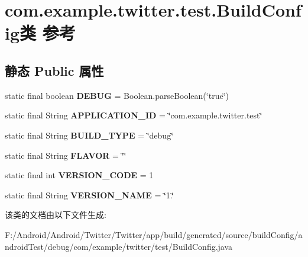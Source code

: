 \hypertarget{classcom_1_1example_1_1twitter_1_1test_1_1_build_config}{}\section{com.\+example.\+twitter.\+test.\+Build\+Config类 参考}
\label{classcom_1_1example_1_1twitter_1_1test_1_1_build_config}
\subsection*{静态 Public 属性}
\begin{DoxyCompactItemize}
\item 
\mbox{\label{classcom_1_1example_1_1twitter_1_1test_1_1_build_config_ab94e8127b73254c70626cb589c6c1d65}} 
static final boolean {\bfseries D\+E\+B\+UG} = Boolean.\+parse\+Boolean(\char`\"{}true\char`\"{})
\item 
\mbox{\label{classcom_1_1example_1_1twitter_1_1test_1_1_build_config_aeb41873f73cf3b7f644c9b7e0c5a8932}} 
static final String {\bfseries A\+P\+P\+L\+I\+C\+A\+T\+I\+O\+N\+\_\+\+ID} = \char`\"{}com.\+example.\+twitter.\+test\char`\"{}
\item 
\mbox{\label{classcom_1_1example_1_1twitter_1_1test_1_1_build_config_ac3eedf27570d97a56df8abfcb6372560}} 
static final String {\bfseries B\+U\+I\+L\+D\+\_\+\+T\+Y\+PE} = \char`\"{}debug\char`\"{}
\item 
\mbox{\label{classcom_1_1example_1_1twitter_1_1test_1_1_build_config_ae2790bc36f46a296ea5ec738c947e286}} 
static final String {\bfseries F\+L\+A\+V\+OR} = \char`\"{}\char`\"{}
\item 
\mbox{\label{classcom_1_1example_1_1twitter_1_1test_1_1_build_config_a4411d204c8696c3ef56d2db6340236f6}} 
static final int {\bfseries V\+E\+R\+S\+I\+O\+N\+\_\+\+C\+O\+DE} = 1
\item 
\mbox{\label{classcom_1_1example_1_1twitter_1_1test_1_1_build_config_a545c93cf2f9d012bba500decfce6fc3a}} 
static final String {\bfseries V\+E\+R\+S\+I\+O\+N\+\_\+\+N\+A\+ME} = \char`\"{}1.\char`\"{}
\end{DoxyCompactItemize}


该类的文档由以下文件生成\+:\begin{DoxyCompactItemize}
\item 
F\+:/\+Android/\+Android/\+Twitter/\+Twitter/app/build/generated/source/build\+Config/android\+Test/debug/com/example/twitter/test/Build\+Config.\+java\end{DoxyCompactItemize}
